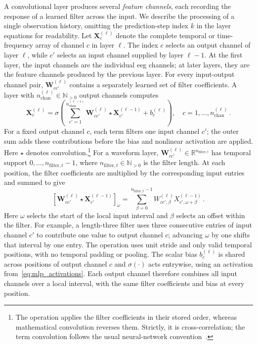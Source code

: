 A convolutional layer produces several \emph{feature channels}, each recording the response of a learned filter across the input.
We describe the processing of a single observation history, omitting the prediction-step index $k$ in the layer equations for readability.
Let $\mathbf X_c^{(\ell)}$ denote the complete temporal or time-frequency array of channel $c$ in layer $\ell$.
The index $c$ selects an output channel of layer $\ell$, while $c'$ selects an input channel supplied by layer $\ell-1$.
At the first layer, the input channels are the individual \ac{eeg} channels; at later layers, they are the feature channels produced by the previous layer.
For every input-output channel pair, $\mathbf W_{cc'}^{(\ell)}$ contains a separately learned set of filter coefficients.
A layer with $n_{\mathrm{chan}}^{(\ell)}\in\mathbb N_{>0}$ output channels computes
\begin{equation}
    \mathbf X_c^{(\ell)}
    =\sigma\!\left(
        \sum_{c'=1}^{n_{\mathrm{chan}}^{(\ell-1)}}
        \mathbf W_{cc'}^{(\ell)}\star\mathbf X_{c'}^{(\ell-1)}
        +b_c^{(\ell)}
    \right),
    \quad c=1,\ldots,n_{\mathrm{chan}}^{(\ell)}\,.
    \label{eq:cnn_temporal_layer}
\end{equation}
For a fixed output channel $c$, each term filters one input channel $c'$; the outer sum adds these contributions before the bias and nonlinear activation are applied.
Here $\star$ denotes convolution.\footnote{The operation applies the filter coefficients in their stored order, whereas mathematical convolution reverses them.
Strictly, it is cross-correlation; the term convolution follows the usual neural-network convention~\cite{Goodfellow2016}.}
For a waveform layer, $\mathbf W_{cc'}^{(\ell)}\in\mathbb R^{n_{\mathrm{filter},t}}$ has temporal support $0,\ldots,n_{\mathrm{filter},t}-1$, where $n_{\mathrm{filter},t}\in\mathbb N_{>0}$ is the filter length.
At each position, the filter coefficients are multiplied by the corresponding input entries and summed to give
\begin{equation*}
    {\left[\mathbf W_{cc'}^{(\ell)}\star\mathbf X_{c'}^{(\ell-1)}\right]}_\omega
    =\sum_{\beta=0}^{n_{\mathrm{filter},t}-1}
    W_{cc',\beta}^{(\ell)}X_{c',\omega+\beta}^{(\ell-1)}\,.
\end{equation*}
Here $\omega$ selects the start of the local input interval and $\beta$ selects an offset within the filter.
For example, a length-three filter uses three consecutive entries of input channel $c'$ to contribute one value to output channel $c$; advancing $\omega$ by one shifts that interval by one entry.
The operation uses unit stride and only valid temporal positions, with no temporal padding or pooling.
The scalar bias $b_c^{(\ell)}$ is shared across positions of output channel $c$ and $\sigma(\cdot)$ acts entrywise, using an activation from~\eqref{eq:mlp_activations}.
Each output channel therefore combines all input channels over a local interval, with the same filter coefficients and bias at every position.

